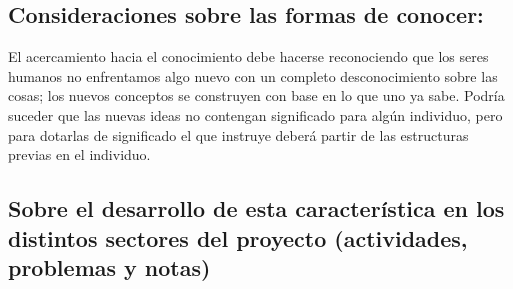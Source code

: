 \documentclass[10pt,letterpaper,oneside]{book}
\begin{document}
		\subsection*{Consideraciones sobre las formas de conocer:}
		El acercamiento hacia el conocimiento debe hacerse reconociendo que los seres humanos no enfrentamos algo nuevo con un completo desconocimiento sobre las cosas; los nuevos conceptos se construyen con base en lo que uno ya sabe. Podría suceder que las nuevas ideas no contengan significado para algún individuo, pero para dotarlas de significado el que instruye deberá partir de las estructuras previas en el individuo.
		
		\subsection*{Sobre el desarrollo de esta característica en los distintos sectores del proyecto (actividades, problemas y notas)}
		
\end{document}
